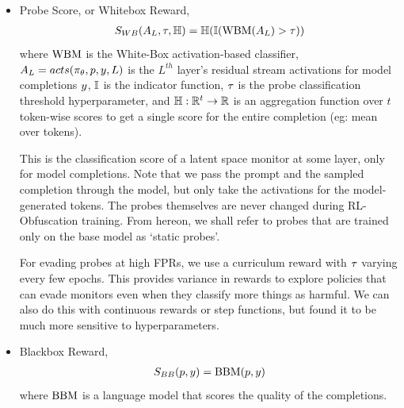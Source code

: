 \vspace{-8pt}
\begin{itemize}
    \item Probe Score, or Whitebox Reward,
    \begin{align}
        S_{WB}(A_{L}, \tau, \mathbb{H}) = \mathbb{H}(\mathbb{I}(\text{WBM}(A_{L}) > \tau))
        \label{eq:probe_score}
    \end{align}
    where 
    $\text{WBM}$ is the White-Box activation-based classifier, 
    $A_{L} = acts(\pi_{\theta}, p, y, L)$ is the $L^{th}$ layer's residual stream activations for model completions $y$, 
    $\mathbb{I}$ is the indicator function, 
    $\tau$ is the probe classification threshold hyperparameter, and 
    $\mathbb{H}: \mathbb{R}^t \rightarrow \mathbb{R}$ is an aggregation function over $t$ token-wise scores to get a single score for the entire completion (eg: mean over tokens).
    
    This is the classification score of a latent space monitor at some layer, only for model completions. Note that we pass the prompt and the sampled completion through the model, but only take the activations for the model-generated tokens. 
    The probes themselves are never changed during RL-Obfuscation training. From hereon, we shall refer to probes that are trained only on the base model as `static probes'. 

    For evading probes at high FPRs, we use a curriculum reward with $\tau$ varying every few epochs. 
    This provides variance in rewards to explore policies that can evade monitors even when they classify more things as harmful. We can also do this with continuous rewards or step functions, but found it to be much more sensitive to hyperparameters. 
    
    \item Blackbox Reward, 
    \begin{align}
        S_{BB}(p, y) = \text{BBM}(p, y)
        \label{eq:blackbox_reward}
    \end{align} where $\text{BBM}$ is a language model that scores the quality of the completions. 


\end{itemize}
